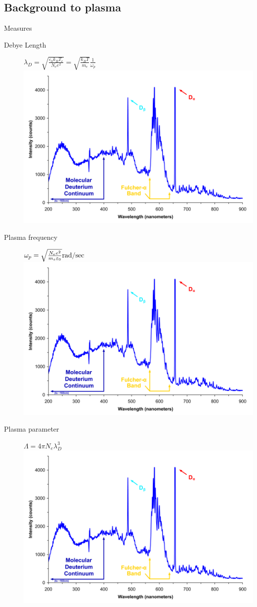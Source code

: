 \documentclass[]{beamer}
\begin{document}
  \subsection{Background to plasma}
  \begin{frame}{Measures}
  \begin{description}
      \item[Debye Length] $\lambda_D=\sqrt{\frac{\varepsilon_0 k_B T_e}{N_e e^2}}=\sqrt{\frac{k_B T}{m_e}}\frac{1}{\omega_p}$ \includegraphics[width=.2\textwidth]{figures/Deuterium_lamp_1.png}
      \item[Plasma frequency] $ \omega_p=\sqrt{\frac{N_e e^2}{m_e \varepsilon_0}}\si[per-mode=fraction]{\radian\per\sec} $ \includegraphics[width=.2\textwidth]{figures/Deuterium_lamp_1.png}
      \item[Plasma parameter] $ \Lambda=4\pi N_e \lambda_D ^3 $ \includegraphics[width=.2\textwidth]{figures/Deuterium_lamp_1.png}
  \end{description}
  \end{frame}
\end{document}

